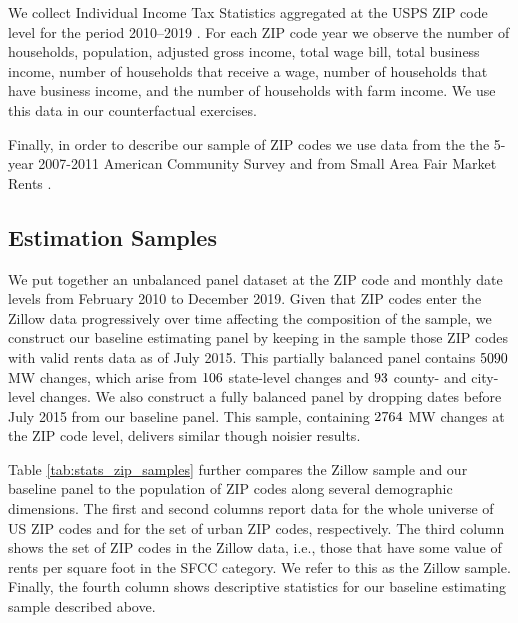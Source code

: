 We collect Individual Income Tax Statistics aggregated at the USPS ZIP code 
level for the period 2010--2019 \parencite{IRS}.
For each ZIP code year we observe the number of households, population, adjusted 
gross income, total wage bill, total business income, number of households that 
receive a wage, number of households that have business income, and the number 
of households with farm income.
We use this data in our counterfactual exercises.

Finally, in order to describe our sample of ZIP codes we use data from the 
the 5-year 2007-2011 American Community Survey \parencite[ACS;][]{CensusACS} and 
from Small Area Fair Market Rents \parencite[SAFMR;][]{hudSAFMR}.


\subsection{Estimation Samples}\label{sec:data_final_panel}

We put together an unbalanced panel dataset at the ZIP code and monthly date 
levels from February 2010 to December 2019.
Given that ZIP codes enter the Zillow data progressively over time affecting 
the composition of the sample,
we construct our baseline estimating panel by keeping in the sample those ZIP 
codes with valid rents data as of July 2015.
This partially balanced panel contains $\textnormal{5090}$ MW changes, which 
arise from $\textnormal{106}$ state-level changes and $\textnormal{93}$ 
county- and city-level changes.
We also construct a fully balanced panel by dropping dates before July 2015 
from our baseline panel.
This sample, containing $\textnormal{2764}$ MW changes at the ZIP code level, 
delivers similar though noisier results.

Table \ref{tab:stats_zip_samples} further compares the Zillow sample and our
baseline panel to the population of ZIP codes along several demographic 
dimensions. 
The first and second columns report data for the whole universe of US ZIP codes 
and for the set of urban ZIP codes, respectively.
The third column shows the set of ZIP codes in the Zillow data, i.e., those 
that have some value of rents per square foot in the SFCC category.
We refer to this as the Zillow sample.
Finally, the fourth column shows descriptive statistics for our baseline 
estimating sample described above.

